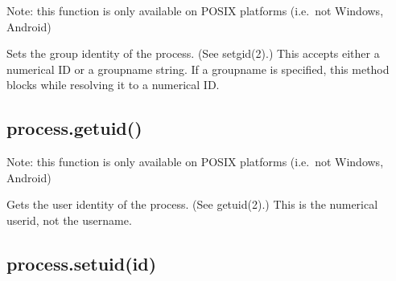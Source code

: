 Note: this function is only available on POSIX platforms (i.e.~not
Windows, Android)

Sets the group identity of the process. (See setgid(2).) This accepts
either a numerical ID or a groupname string. If a groupname is
specified, this method blocks while resolving it to a numerical ID.

\begin{Shaded}
\begin{Highlighting}[]
 \NormalTok{(} \NormalTok{&& }\NormalTok{) \{}
  \NormalTok{(} \NormalTok{+ }\NormalTok{());}
   \NormalTok{\{}
    \NormalTok{(}\NormalTok{);}
    \NormalTok{(} \NormalTok{+ }\NormalTok{());}
  \NormalTok{\}}
   
    \NormalTok{(} 
  \NormalTok{\}}
\NormalTok{\}}
\end{Highlighting}
\end{Shaded}

\subsection{process.getuid()}\label{process.getuid}

Note: this function is only available on POSIX platforms (i.e.~not
Windows, Android)

Gets the user identity of the process. (See getuid(2).) This is the
numerical userid, not the username.

\begin{Shaded}
\begin{Highlighting}[]
 \NormalTok{(}\NormalTok{) \{}
  \NormalTok{(} \NormalTok{+ }\NormalTok{());}
\NormalTok{\}}
\end{Highlighting}
\end{Shaded}

\subsection{process.setuid(id)}\label{process.setuidid}

